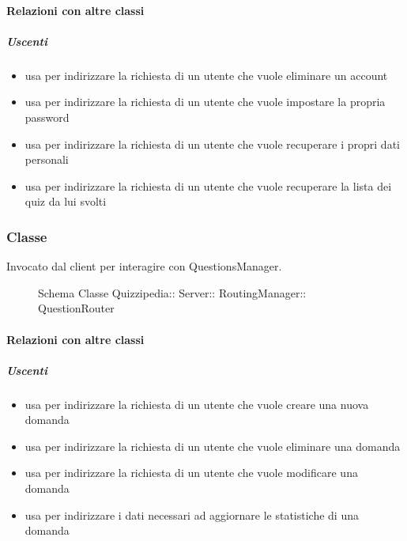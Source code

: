 \paragraph{Relazioni con altre classi}
\subparagraph{Uscenti}
\begin{itemize}
\item usa  per indirizzare la richiesta di un utente che vuole eliminare un account
\item usa  per indirizzare la richiesta di un utente che vuole impostare la propria password
\item usa  per indirizzare la richiesta di un utente che vuole recuperare i propri dati personali
\item usa  per indirizzare la richiesta di un utente che vuole recuperare la lista dei quiz da lui svolti
\end{itemize}
\subsubsection{Classe }
Invocato dal client per interagire con QuestionsManager.
\begin{figure}[H]
\centering
\noindent{}
\caption[Schema Classe QuestionRouter]{Schema Classe Quizzipedia:: Server:: RoutingManager:: QuestionRouter}
\end{figure}
\paragraph{Relazioni con altre classi}
\subparagraph{Uscenti}
\begin{itemize}
\item usa  per indirizzare la richiesta di un utente che vuole creare una nuova domanda
\item usa  per indirizzare la richiesta di un utente che vuole eliminare una domanda
\item usa  per indirizzare la richiesta di un utente che vuole modificare una domanda
\item usa  per indirizzare i dati necessari ad aggiornare le statistiche di una domanda
\end{itemize}
